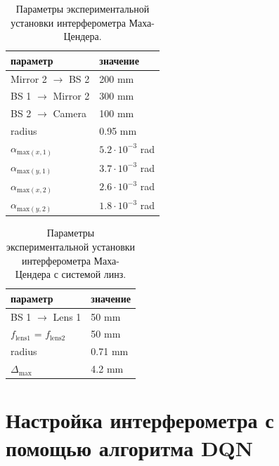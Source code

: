 \begin{table} [htbp]
    \centering
    \begin{threeparttable}
        \caption{Параметры экспериментальной установки интерферометра Маха-Цендера.}\label{tab:MZI_params}
        \begin{tabular}{| p{5cm} || p{5cm} |}
            \hline
            \hline
            параметр & значение \\
            \hline
            Mirror 2 $\to$ BS 2 & 200 mm\\
            BS 1 $\to$ Mirror 2 & 300 mm\\
            BS 2 $\to$ Camera & 100 mm\\
            radius & 0.95 mm\\
            $\alpha_{{\mathrm{max}}(x,1)}$ & $5.2 \cdot 10^{-3}$ rad\\
            $\alpha_{{\mathrm{max}}(y,1)}$ & $3.7 \cdot 10^{-3}$ rad\\
            $\alpha_{{\mathrm{max}}(x,2)}$ & $2.6 \cdot 10^{-3}$ rad\\
            $\alpha_{{\mathrm{max}}(y,2)}$ & $1.8 \cdot 10^{-3}$ rad\\
            \hline
            \hline
        \end{tabular}
    \end{threeparttable}
\end{table}

\begin{table} [htbp]
    \centering
    \begin{threeparttable}
        \caption{Параметры экспериментальной установки интерферометра Маха-Цендера с системой линз.}\label{tab:MZI_lens_params}
        \begin{tabular}{| p{5cm} || p{5cm} |}
            \hline
            \hline
            параметр & значение \\
            \hline
            BS 1 $\to$ Lens 1 & 50 mm\\
            $f_{\mathrm{lens 1}}$ = $f_{\mathrm{lens 2}}$ & 50 mm\\
            radius & 0.71 mm\\
            $\Delta_{\mathrm{max}}$ & 4.2 mm\\
            \hline
            \hline
        \end{tabular}
    \end{threeparttable}
\end{table}


\section{Настройка интерферометра с помощью алгоритма DQN}\label{sec:ch2/sec3}

